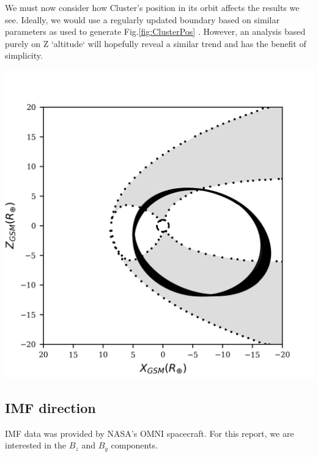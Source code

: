 \documentclass{article}
\newenvironment{Figure}
  {\par\medskip\noindent\minipage{\linewidth}}
  {\endminipage\par\medskip}
\begin{document}
\begin{multicols}{2}
We must now consider how Cluster's position in its orbit affects the results we see. Ideally, we would use a regularly updated boundary based on similar parameters as used to generate Fig.\ref{fig:ClusterPos} \cite{substormConfModel}. However, an analysis based purely on Z `altitude` will hopefully reveal a similar trend and has the benefit of simplicity.
\begin{Figure}
    \centering
    \includegraphics[width=0.75\linewidth]{sc_pos_09_05_coloured.png}
    \label{fig:ClusterPos}
\end{Figure}

\subsection{IMF direction}
IMF data was provided by NASA's OMNI spacecraft. For this report, we are interested in the $B_z$ and $B_y$ components.


\end{multicols}
\end{document}
